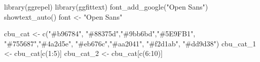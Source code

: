 \documentclass[
  letterpaper,
  DIV=11,
  numbers=noendperiod]{scrreprt}
\newenvironment{Shaded}{\begin{snugshade}}{\end{snugshade}}
\newcommand{\DecValTok}[1]{\textcolor[rgb]{0.68,0.00,0.00}{#1}}
\newcommand{\FunctionTok}[1]{\textcolor[rgb]{0.28,0.35,0.67}{#1}}
\newcommand{\NormalTok}[1]{\textcolor[rgb]{0.00,0.23,0.31}{#1}}
\newcommand{\OtherTok}[1]{\textcolor[rgb]{0.00,0.23,0.31}{#1}}
\newcommand{\SpecialCharTok}[1]{\textcolor[rgb]{0.37,0.37,0.37}{#1}}
\newcommand{\StringTok}[1]{\textcolor[rgb]{0.13,0.47,0.30}{#1}}
\begin{document}
\begin{Shaded}
\begin{Highlighting}[]
\FunctionTok{library}\NormalTok{(ggrepel)}
\FunctionTok{library}\NormalTok{(ggfittext)}
\FunctionTok{font\_add\_google}\NormalTok{(}\StringTok{"Open Sans"}\NormalTok{)}
\FunctionTok{showtext\_auto}\NormalTok{()}
\NormalTok{font }\OtherTok{\textless{}{-}} \StringTok{"Open Sans"}


\NormalTok{cbu\_cat }\OtherTok{\textless{}{-}} \FunctionTok{c}\NormalTok{(}\StringTok{"\#b96784"}\NormalTok{, }\StringTok{"\#88375d"}\NormalTok{,}\StringTok{"\#9bb6bd"}\NormalTok{,}\StringTok{"\#5E9FB1"}\NormalTok{, }\StringTok{"\#755687"}\NormalTok{,}\StringTok{"\#4a2d5e"}\NormalTok{, }\StringTok{"\#eb676c"}\NormalTok{,}\StringTok{"\#aa2041"}\NormalTok{, }\StringTok{"\#f2d1ab"}\NormalTok{, }\StringTok{"\#dd9d38"}\NormalTok{)}
\NormalTok{cbu\_cat\_1 }\OtherTok{\textless{}{-}}\NormalTok{ cbu\_cat[}\FunctionTok{c}\NormalTok{(}\DecValTok{1}\SpecialCharTok{:}\DecValTok{5}\NormalTok{)]}
\NormalTok{cbu\_cat\_2 }\OtherTok{\textless{}{-}}\NormalTok{ cbu\_cat[}\FunctionTok{c}\NormalTok{(}\DecValTok{6}\SpecialCharTok{:}\DecValTok{10}\NormalTok{)]}


\end{Highlighting}
\end{Shaded}
\end{document}
